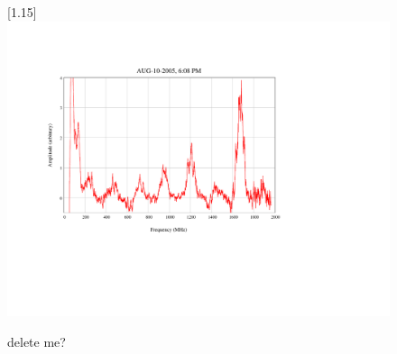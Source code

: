 \begin{figure}
\scalebox{1.15}[1.15]{
\includegraphics[viewport=150 200 300 450, bb=85 160 300 550]
{23-12-no-seed/23-12-no-seed.pdf}
}
\caption{delete me?}
\label{23-12-no-seed}
\end{figure}
